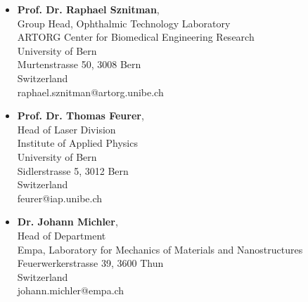 \documentclass[11pt,a4paper,sans]{moderncv} %
\begin{document}
\begin{itemize}
\item \textbf{Prof. Dr. Raphael Sznitman},\\
Group Head, Ophthalmic Technology Laboratory\\
ARTORG Center for Biomedical Engineering Research\\
University of Bern\\
Murtenstrasse 50, 3008 Bern\\
Switzerland\\
raphael.sznitman@artorg.unibe.ch

\item \textbf{Prof. Dr. Thomas Feurer},\\
Head of Laser Division\\ 
Institute of Applied Physics\\
University of Bern\\
Sidlerstrasse 5, 3012 Bern\\
Switzerland\\
feurer@iap.unibe.ch

\item \textbf{Dr. Johann Michler},\\
Head of Department\\
Empa, Laboratory for Mechanics of Materials and Nanostructures\\
Feuerwerkerstrasse 39, 3600 Thun\\
Switzerland\\
johann.michler@empa.ch

\end{itemize}
\end{document}
